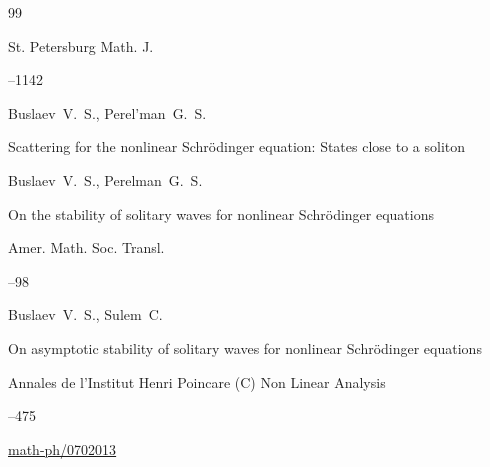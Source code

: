 \begin{thebibliography}{99}







\jour St. Petersburg Math. J.




--1142

\by Buslaev~V.~S., Perel'man~G.~S.

\paper Scattering for the nonlinear Schrödinger equation: States close to a soliton




\by Buslaev~V.~S., Perelman~G.~S. 

\paper On the stability of solitary waves for nonlinear Schrödinger equations



\jour Amer. Math. Soc. Transl.



--98





\by Buslaev~V.~S., Sulem~C.

\paper On asymptotic stability of solitary waves for nonlinear Schrödinger equations

\jour Annales de l'Institut Henri Poincare (C) Non Linear Analysis




--475


\arxiv \href{https://arxiv.org/abs/math-ph/0702013}{math-ph/0702013}




\end{thebibliography}
